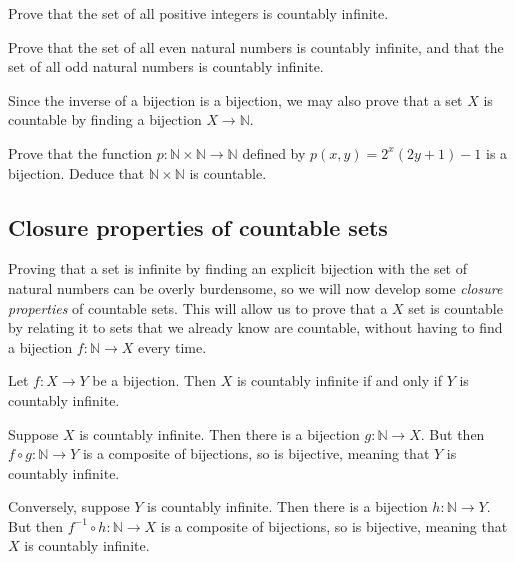 \begin{exercise}
\label{exPositiveIntegersCountablyInfinite}
Prove that the set of all positive integers is countably infinite.
\end{exercise}

\begin{exercise}
\label{exEvenOddNaturalNumbersCountablyInfinite}
Prove that the set of all even natural numbers is countably infinite, and that the set of all odd natural numbers is countably infinite.
\end{exercise}

Since the inverse of a bijection is a bijection, we may also prove that a set $X$ is countable by finding a bijection $X \to \mathbb{N}$.

\begin{exercise}
Prove that the function $p : \mathbb{N} \times \mathbb{N} \to \mathbb{N}$ defined by $p(x,y) = 2^x(2y+1)-1$ is a bijection. Deduce that $\mathbb{N} \times \mathbb{N}$ is countable.
\end{exercise}

\subsection*{Closure properties of countable sets}

Proving that a set is infinite by finding an explicit bijection with the set of natural numbers can be overly burdensome, so we will now develop some \textit{closure properties} of countable sets. This will allow us to prove that a $X$ set is countable by relating it to sets that we already know are countable, without having to find a bijection $f : \mathbb{N} \to X$ every time.

\begin{proposition}
\label{propCountablyInfiniteFromBijection}
Let $f : X \to Y$ be a bijection. Then $X$ is countably infinite if and only if $Y$ is countably infinite.
\end{proposition}

\begin{cproof}
Suppose $X$ is countably infinite. Then there is a bijection $g : \mathbb{N} \to X$. But then $f \circ g : \mathbb{N} \to Y$ is a composite of bijections, so is bijective, meaning that $Y$ is countably infinite.

Conversely, suppose $Y$ is countably infinite. Then there is a bijection $h : \mathbb{N} \to Y$. But then $f^{-1} \circ h : \mathbb{N} \to X$ is a composite of bijections, so is bijective, meaning that $X$ is countably infinite.
\end{cproof}

